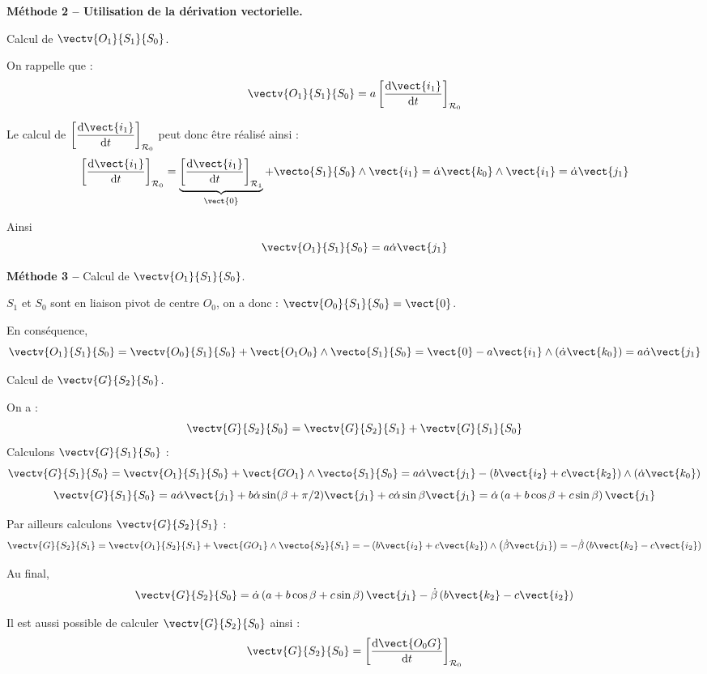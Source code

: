 \begin{corrige}
\textbf{Méthode 2 -- Utilisation de la dérivation vectorielle.}

Calcul de $\vectv{O_1}{S_1}{S_0}$.

On rappelle que :
$$
\vectv{O_1}{S_1}{S_0} 
= a \left[\dfrac{\text{d}  \vect{i_1} }{\text{d}t}\right]_{\mathcal{R}_0}
$$

Le calcul de $\left[\dfrac{\text{d}  \vect{i_1} }{\text{d}t}\right]_{\mathcal{R}_0}$ peut donc être réalisé ainsi : 
$$ 
\left[\dfrac{\text{d}  \vect{i_1} }{\text{d}t}\right]_{\mathcal{R}_0} = 
\underbrace{\left[\dfrac{\text{d}  \vect{i_1} }{\text{d}t}\right]_{\mathcal{R}_1}}_{\vect{0}} + \vecto{S_1}{S_0}\wedge \vect{i_1}
=\dot{\alpha}\vect{k_0}  \wedge \vect{i_1}
=\dot{\alpha} \vect{j_1}
$$

Ainsi 
$$
\vectv{O_1}{S_1}{S_0} 
= a \dot{\alpha} \vect{j_1}
$$

\textbf{Méthode 3 -- }
Calcul de $\vectv{O_1}{S_1}{S_0}$.

$S_1$ et $S_0$ sont en liaison pivot de centre $O_0$, on a donc :  $\vectv{O_0}{S_1}{S_0}=\vect{0}$.

En conséquence, 
$$
\vectv{O_1}{S_1}{S_0} = \vectv{O_0}{S_1}{S_0} + \vect{O_1O_0}\wedge   \vecto{S_1}{S_0} = \vect{0} - a \vect{i_1} \wedge \left( \dot{\alpha}\vect{k_0} \right)
=a \dot{\alpha}\vect{j_1}
$$

\end{corrige}\else \fi

%
%
%
%
\ifprof
\begin{corrige}

Calcul de $\vectv{G}{S_2}{S_0}$.

On a : 
$$\vectv{G}{S_2}{S_0} = \vectv{G}{S_2}{S_1} + \vectv{G}{S_1}{S_0} $$
Calculons $\vectv{G}{S_1}{S_0}$ :
$$
\vectv{G}{S_1}{S_0} 
= \vectv{O_1}{S_1}{S_0} + \vect{GO_1}\wedge\vecto{S_1}{S_0}
= a\dot{\alpha}\vect{j_1} - \left(b\vect{i_2} + c\vect{k_2}\right) \wedge\left( \dot{\alpha} \vect{k_0}\right)
$$
$$
\vectv{G}{S_1}{S_0} 
= a\dot{\alpha}\vect{j_1}  + b\dot{\alpha} \sin(\beta+\pi/2) \vect{j_1} + c \dot{\alpha}\sin\beta\vect{j_1}
= \dot{\alpha} \left(a+b \cos\beta + c \sin\beta\right) \vect{j_1} 
$$

Par ailleurs calculons $\vectv{G}{S_2}{S_1}$ :
$$\vectv{G}{S_2}{S_1} = \vectv{O_1}{S_2}{S_1} + \vect{GO_1}\wedge \vecto{S_2}{S_1}
=-\left(b\vect{i_2}+c\vect{k_2}\right) \wedge \left(\dot{\beta}\vect{j_1}\right)
=-\dot{\beta}\left(b\vect{k_2}-c\vect{i_2} \right)
$$

Au final, 
$$\vectv{G}{S_2}{S_0} = \dot{\alpha} \left(a+b \cos\beta + c \sin\beta\right) \vect{j_1} 
-\dot{\beta}\left(b\vect{k_2}-c\vect{i_2} \right)
$$

Il est aussi possible de calculer $\vectv{G}{S_2}{S_0}$ ainsi : 
$$\vectv{G}{S_2}{S_0} = \left[\dfrac{\text{d} \vect{O_0G}}{\text{d}t}\right]_{\mathcal{R}_0}$$ 

\end{corrige}\else \fi


